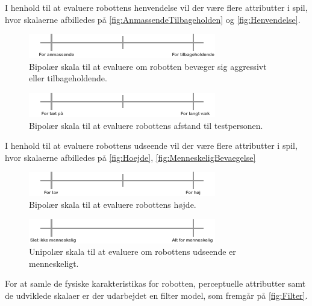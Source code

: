 \noindent
%
I henhold til at evaluere robottens henvendelse vil der være flere attributter i spil, hvor skalaerne afbilledes på \autoref{fig:AnmassendeTilbageholden} og \autoref{fig:Henvendelse}.  
%
\begin{figure}[H]
\centering
\includegraphics[width =\textwidth]{Figure/AnmasendeTilbageholden} 
\caption{Bipolær skala til at evaluere om robotten bevæger sig aggressivt eller tilbageholdende.}
\label{fig:AnmassendeTilbageholden}
\end{figure}
\noindent
%
%
\begin{figure}[H]
\centering
\includegraphics[width =\textwidth]{Figure/Henvendelse} 
\caption{Bipolær skala til at evaluere robottens afstand til testpersonen.}
\label{fig:Henvendelse}
\end{figure}
\noindent
%
I henhold til at evaluere robottens udseende vil der være flere attributter i spil, hvor skalaerne afbilledes på \autoref{fig:Hoejde}, \autoref{fig:MenneskeligBevaegelse}
%
\begin{figure}[H]
\centering
\includegraphics[width =\textwidth]{Figure/Hoejde} 
\caption{Bipolær skala til at evaluere robottens højde.}
\label{fig:Hoejde}
\end{figure}
\noindent
%
%
\begin{figure}[H]
\centering
\includegraphics[width =\textwidth]{Figure/Menneskelig} 
\caption{Unipolær skala til at evaluere om robottens udseende er menneskeligt.}
\label{fig:MenneskeligUdseende}
\end{figure}
\noindent
%
For at samle de fysiske karakteristikas for robotten, perceptuelle attributter samt de udviklede skalaer er der udarbejdet en filter model, som fremgår på \autoref{fig:Filter}.
